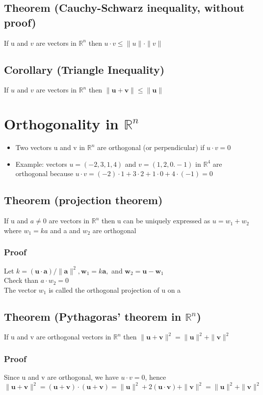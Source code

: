 \documentclass{article}[18pt]
\begin{document}
\subsection{Theorem (Cauchy-Schwarz inequality, without proof)}
If u and $v$ are vectors in $\mathbb { R } ^ { n }$ then $u \cdot v \leq \| u \| \cdot \| v \|$
\subsection{Corollary (Triangle Inequality)}
If $u$ and $v$ are vectors in $\mathbb { R } ^ { n }$ then $\| \mathbf { u } + \mathbf { v } \| \leq \| \mathbf { u } \|$
\section{Orthogonality in $\mathbb{ R }^n$}
\begin{itemize}
	\item Two vectors u and v in $\mathbb{ R }^n$ are orthogonal (or perpendicular) if $u\cdot v=0$
	\item Example: vectors $u=(-2,3,1,4)$ and $v=(1,2,0.-1)$ in $\mathbb{ R }^4$ are orthogonal because $u\cdot v=(-2)\cdot 1+3\cdot 2+1\cdot 0+4\cdot (-1)=0$
\end{itemize}
\subsection{Theorem (projection theorem)}
If u and $a\neq 0$ are vectors in $\mathbb{ R }^n$ then u can be uniquely expressed as $u=w_1+w_2$ where $w_1=ka$ and a and $w_2$ are orthogonal
\subsubsection{Proof}
Let $k = ( \mathbf { u } \cdot \mathbf { a } ) / \| \mathbf { a } \| ^ { 2 } , \mathbf { w } _ { 1 } = k \mathbf { a } ,$ and $\mathbf { w } _ { 2 } = \mathbf { u } - \mathbf { w } _ { 1 }$\\
Check than $a\cdot w_2=0$\\
The vector $w_1$ is called the orthogonal projection of u on a
\subsection{Theorem (Pythagoras' theorem in $\mathbb{ R }^n$)}
If u and v are orthogonal vectors in $\mathbb{ R }^n$ then $\| \mathbf { u } + \mathbf { v } \| ^ { 2 } = \| \mathbf { u } \| ^ { 2 } + \| \mathbf { v } \| ^ { 2 }$
\subsubsection{Proof}
Since u and v are orthogonal, we have $u\cdot v=0$, hence 
$$\| \mathbf { u } + \mathbf { v } \| ^ { 2 } = ( \mathbf { u } + \mathbf { v } ) \cdot ( \mathbf { u } + \mathbf { v } ) = \| \mathbf { u } \| ^ { 2 } + 2 ( \mathbf { u } \cdot \mathbf { v } ) + \| \mathbf { v } \| ^ { 2 } = \| \mathbf { u } \| ^ { 2 } + \| \mathbf { v} \| ^ { 2 }$$
\end{document}
